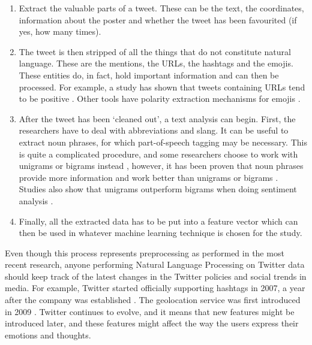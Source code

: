 \begin{enumerate}
    \item Extract the valuable parts of a tweet. These can be the text, the coordinates, information about the poster and whether the tweet has been favourited (if yes, how many times). 
    \item The tweet is then stripped of all the things that do not constitute natural language. These are the mentions, the URLs, the hashtags and the emojis. These entities do, in fact, hold important information and can then be processed. For example, a study has shown that tweets containing URLs tend to be positive \cite{go2009twitter}. Other tools have polarity extraction mechanisms for emojis \cite{novak2015sentiment}. 
    \item After the tweet has been `cleaned out', a text analysis can begin. First, the researchers have to deal with abbreviations and slang. It can be useful to extract noun phrases, for which part-of-speech tagging may be necessary. This is quite a complicated procedure, and some researchers choose to work with unigrams or bigrams instead \cite{mohammad2013nrc}, however, it has been proven that noun phrases provide more information and work better than unigrams or bigrams \cite{whitman2002inferring}. Studies also show that unigrams outperform bigrams when doing sentiment analysis \cite{gamon2004sentiment}.
    \item Finally, all the extracted data has to be put into a feature vector which can then be used in whatever machine learning technique is chosen for the study.
\end{enumerate}

Even though this process represents preprocessing as performed in the most recent research, anyone performing Natural Language Processing on Twitter data should keep track of the latest changes in the Twitter policies and social trends in media. For example, Twitter started officially supporting hashtags in 2007, a year after the company was established \cite{twittermilestones}. The geolocation service was first introduced in 2009 \cite{twitterlocation}. Twitter continues to evolve, and it means that new features might be introduced later, and these features might affect the way the users express their emotions and thoughts.



 
 